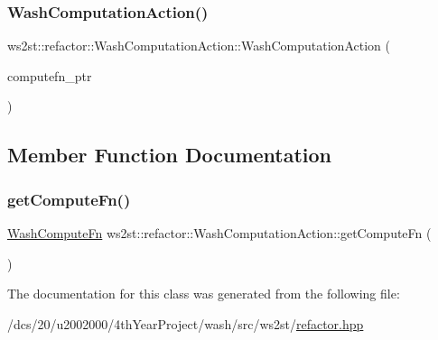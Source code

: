 \subsubsection{\texorpdfstring{Wash\+Computation\+Action()}{WashComputationAction()}}
{\footnotesize\ttfamily ws2st\+::refactor\+::\+Wash\+Computation\+Action\+::\+Wash\+Computation\+Action (\begin{DoxyParamCaption}\item[{\mbox{\hyperlink{namespacews2st_a77544d74f310dc9ec5c11bffa3ea77b6}{Wash\+Compute\+Fn}}}]{computefn\+\_\+ptr }\end{DoxyParamCaption})\hspace{0.3cm}{\ttfamily [inline]}}



\subsection{Member Function Documentation}
\mbox{\label{classws2st_1_1refactor_1_1WashComputationAction_a195edd152f7fd88ca90d6dc7fb4897dc}} 
\subsubsection{\texorpdfstring{get\+Compute\+Fn()}{getComputeFn()}}
{\footnotesize\ttfamily \mbox{\hyperlink{namespacews2st_a77544d74f310dc9ec5c11bffa3ea77b6}{Wash\+Compute\+Fn}} ws2st\+::refactor\+::\+Wash\+Computation\+Action\+::get\+Compute\+Fn (\begin{DoxyParamCaption}{ }\end{DoxyParamCaption})\hspace{0.3cm}{\ttfamily [inline]}}



The documentation for this class was generated from the following file\+:\begin{DoxyCompactItemize}
\item 
/dcs/20/u2002000/4th\+Year\+Project/wash/src/ws2st/\mbox{\hyperlink{refactor_8hpp}{refactor.\+hpp}}\end{DoxyCompactItemize}
